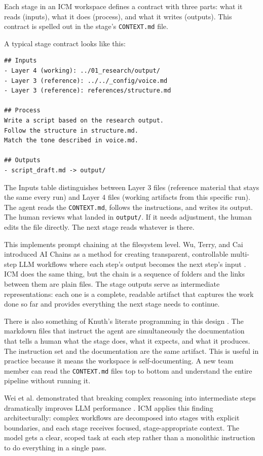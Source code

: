\documentclass[acmlarge,nonacm,screen]{acmart}
\begin{document}
Each stage in an ICM workspace defines a contract with three parts: what it reads (inputs), what it does (process), and what it writes (outputs). This contract is spelled out in the stage's \texttt{CONTEXT.md} file.

A typical stage contract looks like this:

\begin{lstlisting}
## Inputs
- Layer 4 (working): ../01_research/output/
- Layer 3 (reference): ../../_config/voice.md
- Layer 3 (reference): references/structure.md

## Process
Write a script based on the research output.
Follow the structure in structure.md.
Match the tone described in voice.md.

## Outputs
- script_draft.md -> output/
\end{lstlisting}

The Inputs table distinguishes between Layer 3 files (reference material that stays the same every run) and Layer 4 files (working artifacts from this specific run). The agent reads the \texttt{CONTEXT.md}, follows the instructions, and writes its output. The human reviews what landed in \texttt{output/}. If it needs adjustment, the human edits the file directly. The next stage reads whatever is there.

This implements prompt chaining at the filesystem level. Wu, Terry, and Cai introduced AI Chains as a method for creating transparent, controllable multi-step LLM workflows where each step's output becomes the next step's input \cite{wu2022chains}. ICM does the same thing, but the chain is a sequence of folders and the links between them are plain files. The stage outputs serve as intermediate representations: each one is a complete, readable artifact that captures the work done so far and provides everything the next stage needs to continue.

There is also something of Knuth's literate programming in this design \cite{knuth1984}. The markdown files that instruct the agent are simultaneously the documentation that tells a human what the stage does, what it expects, and what it produces. The instruction set and the documentation are the same artifact. This is useful in practice because it means the workspace is self-documenting. A new team member can read the \texttt{CONTEXT.md} files top to bottom and understand the entire pipeline without running it.

Wei et al. demonstrated that breaking complex reasoning into intermediate steps dramatically improves LLM performance \cite{wei2022}. ICM applies this finding architecturally: complex workflows are decomposed into stages with explicit boundaries, and each stage receives focused, stage-appropriate context. The model gets a clear, scoped task at each step rather than a monolithic instruction to do everything in a single pass.
\end{document}
